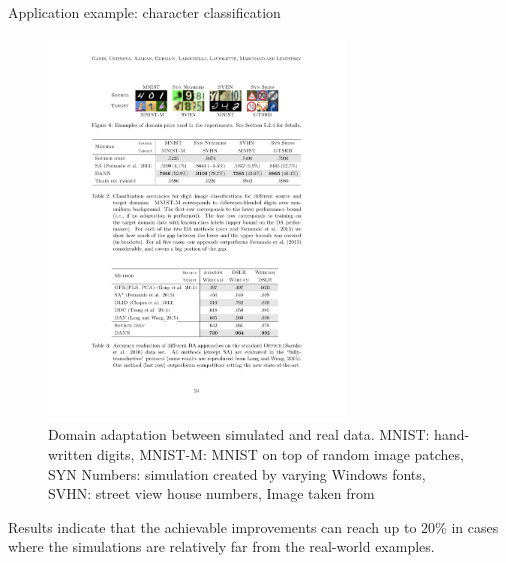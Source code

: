 \documentclass[xcolor=pdftex,dvipsnames,table]{beamer}
\begin{document}
\begin{frame}{Application example: character classification}
\begin{figure}[htb]
   \centering
   \includegraphics[width=0.7\textwidth]{../graphics/domain_adaptation_application.pdf}
   \caption{Domain adaptation between simulated and real data. MNIST: hand-written digits, MNIST-M: MNIST on top of random image patches, SYN Numbers: simulation created by varying Windows fonts, SVHN: street view house numbers, Image taken from \cite{Ganin2016}}
\end{figure}
Results indicate that the achievable improvements can reach up to $20\%$ in cases where the simulations are relatively far from the real-world examples. 
\end{frame}
\end{document}
